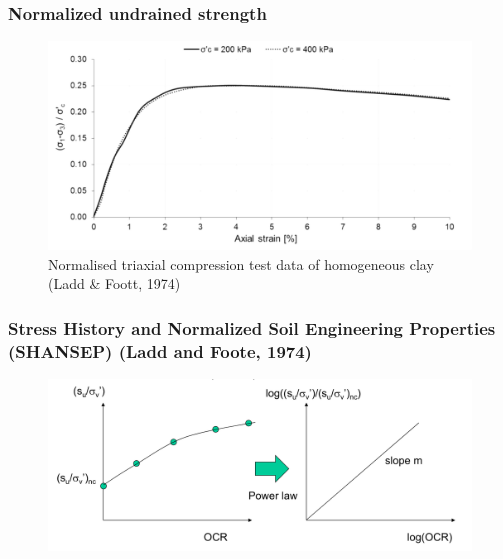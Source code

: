 \documentclass[notes]{beamer}
\begin{document}
\begin{frame}
\frametitle{Normalized undrained strength}
\begin{figure}
	\includegraphics[width=\textwidth]{figs/su_normalised.png}
	\caption*{Normalised triaxial compression test data of homogeneous clay (Ladd \& Foott, 1974)}
\end{figure}
\end{frame}


\begin{frame}
\frametitle{Stress History and Normalized Soil Engineering Properties (SHANSEP) (Ladd and Foote, 1974)}
\begin{figure}
	\includegraphics[width=\textwidth]{figs/shansep.png}
\end{figure}
\end{frame}
\end{document}
